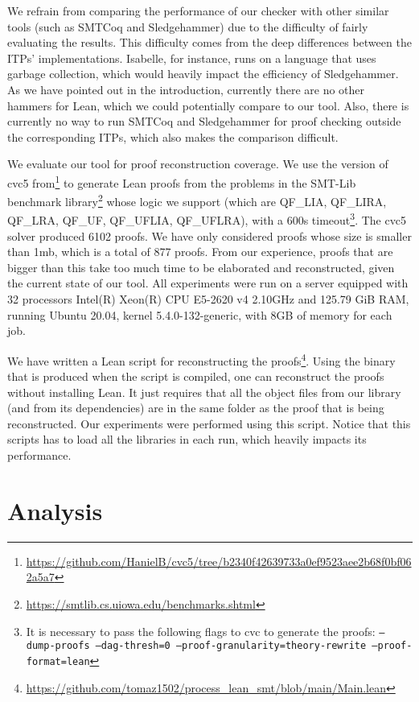 We refrain from comparing the performance of our checker with other similar tools (such as
SMTCoq and Sledgehammer) due to the difficulty of fairly evaluating
the results. This difficulty comes from the deep differences between the ITPs'
implementations. Isabelle, for instance, runs on a language that uses
garbage collection, which would heavily impact the efficiency of
Sledgehammer.
As we have pointed out in the introduction, currently
there are no other hammers for Lean, which we could potentially compare
to our tool.
Also, there is currently no way to run SMTCoq and Sledgehammer for proof checking
outside the corresponding ITPs, which also makes the comparison difficult.

We evaluate our tool for proof reconstruction coverage.
We use the version of cvc5 from\footnote{\url{https://github.com/HanielB/cvc5/tree/b2340f42639733a0ef9523aee2b68f0bf062a5a7}}
to generate Lean proofs from the
problems in the SMT-Lib benchmark library\footnote{\url{https://smtlib.cs.uiowa.edu/benchmarks.shtml}} whose
logic we support (which are QF\_LIA, QF\_LIRA, QF\_LRA, QF\_UF, QF\_UFLIA, QF\_UFLRA), with a 600s timeout\footnote{It is necessary to pass the following flags to cvc to generate the
proofs: \texttt{--dump-proofs --dag-thresh=0 --proof-granularity=theory-rewrite --proof-format=lean}}.
The cvc5 solver produced 6102
proofs. We have only considered proofs whose size is smaller than
1mb, which is a total of 877 proofs. From our experience, proofs that are
bigger than this take too much time to be elaborated and reconstructed,
given the current state of our tool.
All experiments were run on a server
equipped with 32 processors Intel(R) Xeon(R) CPU E5-2620 v4 2.10GHz and
125.79 GiB RAM, running Ubuntu 20.04, kernel 5.4.0-132-generic, with 8GB of memory for each job.

We have written a Lean script for reconstructing the proofs\footnote{\url{https://github.com/tomaz1502/process_lean_smt/blob/main/Main.lean}}. Using the binary that is produced when the script is compiled, one can reconstruct the proofs without installing Lean.
It just requires that all the object files from our library (and from its dependencies) are in the same folder as the proof that is being reconstructed.
Our experiments were performed using this script.
Notice that this scripts has to load all the libraries in each run, which heavily impacts its performance.

\section{Analysis}

